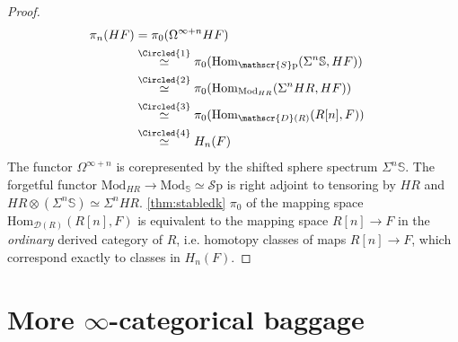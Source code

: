 \documentclass[10pt]{amsart}
\newcommand{\D}{\mathscr{D}}
\newcommand{\bS}{\mathbb{S}}
\newcommand{\Hom}{\mathrm{Hom}}
\newcommand{\Sp}{\mathscr{S}\mathrm{p}}
\newcommand{\Mod}{\mathrm{Mod}}
\theoremstyle{definition}
\theoremstyle{remark}
\numberwithin{equation}{section}
\begin{document}
\begin{proof}
  \begin{align*}
    \pi_n(HF) & =\pi_0(\Omega^{\infty+n}HF)\\
    & \overset{\Circled{1}}{\simeq} \pi_0(\Hom_{\Sp}(\Sigma^n\bS,HF)) \\
    & \overset{\Circled{2}}{\simeq} \pi_0(\Hom_{\Mod_{HR}}(\Sigma^n HR,HF)) & \\
    & \overset{\Circled{3}}{\simeq} \pi_0(\Hom_{\D(R)}(R[n],F))\\
    & \overset{\Circled{4}}{\simeq} H_n(F)
  \end{align*}  The functor $\Omega^{\infty+n}$ is corepresented by the shifted sphere spectrum $\Sigma^n\bS$.  The forgetful functor $\Mod_{HR}\to\Mod_\bS\simeq\Sp$ is right adjoint to tensoring by $HR$ and $HR\otimes(\Sigma^n\bS)\simeq \Sigma^nHR$.  \cref{thm:stabledk}  $\pi_0$ of the mapping space $\Hom_{\D(R)}(R[n],F)$ is equivalent to the mapping space $R[n]\to F$ in the \emph{ordinary} derived category of $R$, i.e. homotopy classes of maps $R[n]\to F$, which correspond exactly to classes in $H_n(F)$.
\end{proof}

\section{More \texorpdfstring{$\infty$}{oo}-categorical baggage}\label{sec:baggage}
\end{document}
